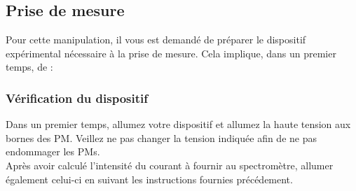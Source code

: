 

\subsection{Prise de mesure}

Pour cette manipulation, il vous est demandé de préparer le dispositif expérimental nécessaire à la prise de mesure. Cela implique, dans un premier temps, de :\\

\begin{center}
\end{center}

\subsubsection{Vérification du dispositif}
Dans un premier temps, allumez votre dispositif et allumez la haute tension aux bornes des PM. Veillez ne pas changer la tension indiquée afin de ne pas endommager les PMs.\\

Après avoir calculé l'intensité du courant à fournir au spectromètre, allumer également celui-ci en suivant les instructions fournies précédement.\\

